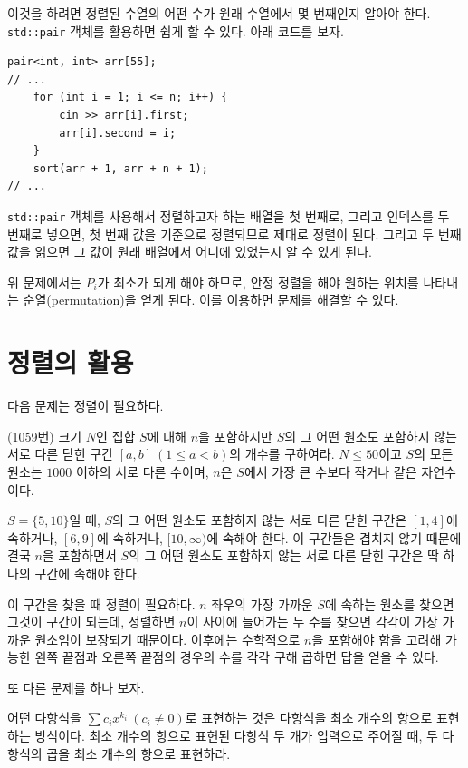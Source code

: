 이것을 하려면 정렬된 수열의 어떤 수가 원래 수열에서 몇 번째인지 알아야 한다. \texttt{std::pair} 객체를 활용하면 쉽게 할 수 있다. 아래 코드를 보자.

\begin{lstlisting}
pair<int, int> arr[55];
// ...
    for (int i = 1; i <= n; i++) {
        cin >> arr[i].first;
        arr[i].second = i;
    }
    sort(arr + 1, arr + n + 1);
// ...
\end{lstlisting}

\texttt{std::pair} 객체를 사용해서 정렬하고자 하는 배열을 첫 번째로, 그리고 인덱스를 두 번째로 넣으면, 첫 번째 값을 기준으로 정렬되므로 제대로 정렬이 된다. 그리고 두 번째 값을 읽으면 그 값이 원래 배열에서 어디에 있었는지 알 수 있게 된다.

위 문제에서는 $P_i$가 최소가 되게 해야 하므로, 안정 정렬을 해야 원하는 위치를 나타내는 순열(permutation)을 얻게 된다. 이를 이용하면 문제를 해결할 수 있다.

\section{정렬의 활용}
다음 문제는 정렬이 필요하다.

\begin{example}
    (1059번) 크기 $N$인 집합 $S$에 대해 $n$을 포함하지만 $S$의 그 어떤 원소도 포함하지 않는 서로 다른 닫힌 구간 $[a, b]~(1 \leq a < b)$의 개수를 구하여라. $N \leq 50$이고 $S$의 모든 원소는 $1000$ 이하의 서로 다른 수이며, $n$은 $S$에서 가장 큰 수보다 작거나 같은 자연수이다.
\end{example}

$S = \{5, 10\}$일 때, $S$의 그 어떤 원소도 포함하지 않는 서로 다른 닫힌 구간은 $[1, 4]$에 속하거나, $[6, 9]$에 속하거나, $[10, \infty)$에 속해야 한다. 이 구간들은 겹치지 않기 때문에 결국 $n$을 포함하면서 $S$의 그 어떤 원소도 포함하지 않는 서로 다른 닫힌 구간은 딱 하나의 구간에 속해야 한다.

이 구간을 찾을 때 정렬이 필요하다. $n$ 좌우의 가장 가까운 $S$에 속하는 원소를 찾으면 그것이 구간이 되는데, 정렬하면 $n$이 사이에 들어가는 두 수를 찾으면 각각이 가장 가까운 원소임이 보장되기 때문이다. 이후에는 수학적으로 $n$을 포함해야 함을 고려해 가능한 왼쪽 끝점과 오른쪽 끝점의 경우의 수를 각각 구해 곱하면 답을 얻을 수 있다.

또 다른 문제를 하나 보자.

\begin{example}
    어떤 다항식을 $\sum c_i x^{k_i}~(c_i \neq 0)$로 표현하는 것은 다항식을 최소 개수의 항으로 표현하는 방식이다. 최소 개수의 항으로 표현된 다항식 두 개가 입력으로 주어질 때, 두 다항식의 곱을 최소 개수의 항으로 표현하라.
\end{example}

